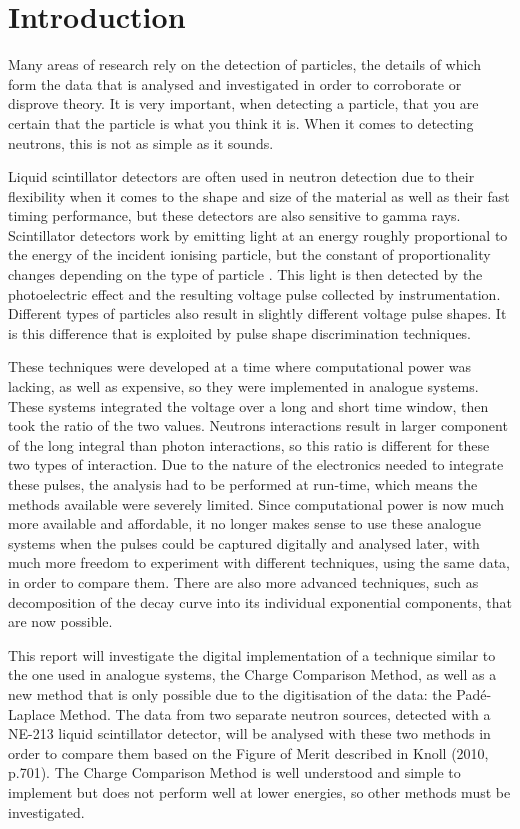 \documentclass[11pt]{article}
\numberwithin{equation}{section}
\numberwithin{figure}{section}
\numberwithin{table}{section}
\begin{document}
\section{Introduction}\label{sec:Introduction}
\par Many areas of research rely on the detection of particles, the details of which form the data that is analysed and investigated in order to corroborate or disprove theory. It is very important, when detecting a particle, that you are certain that the particle is what you think it is. When it comes to detecting neutrons, this is not as simple as it sounds. 
\par Liquid scintillator detectors are often used in neutron detection due to their flexibility when it comes to the shape and size of the material as well as their fast timing performance, but these detectors are also sensitive to gamma rays. Scintillator detectors work by emitting light at an energy roughly proportional to the energy of the incident ionising particle, but the constant of proportionality changes depending on the type of particle \cite{Knoll}. This light is then detected by the photoelectric effect and the resulting voltage pulse collected by instrumentation. Different types of particles also result in slightly different voltage pulse shapes. It is this difference that is exploited by pulse shape discrimination techniques. 
\par These techniques were developed at a time where computational power was lacking, as well as expensive, so they were implemented in analogue systems. These systems integrated the voltage over a long and short time window, then took the ratio of the two values. Neutrons interactions result in larger component of the long integral than photon interactions, so this ratio is different for these two types of interaction. Due to the nature of the electronics needed to integrate these pulses, the analysis had to be performed at run-time, which means the methods available were severely limited. Since computational power is now much more available and affordable, it no longer makes sense to use these analogue systems when the pulses could be captured digitally and analysed later, with much more freedom to experiment with different techniques, using the same data, in order to compare them. There are also more advanced techniques, such as decomposition of the decay curve into its individual exponential components, that are now possible.
\par This report will investigate the digital implementation of a technique similar to the one used in analogue systems, the Charge Comparison Method, as well as a new method that is only possible due to the digitisation of the data: the Pad\'e-Laplace Method. The data from two separate neutron sources, detected with a NE-213 liquid scintillator detector, will be analysed with these two methods in order to compare them based on the Figure of Merit described in Knoll (2010, p.701). The Charge Comparison Method is well understood and simple to implement but does not perform well at lower energies, so other methods must be investigated.
\end{document}
